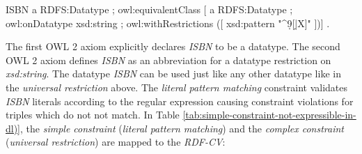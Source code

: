 \documentclass[a4paper,fontsize=11pt]{scrartcl}
\newcommand{\tb}[1]{\todo[size=\small, color=green!40]{\textbf{Thomas:} #1}}
\newcommand{\ms}[1]{\texttt{#1}}
\begin{document}
\begin{ex}
ISBN a RDFS:Datatype ; owl:equivalentClass [ a RDFS:Datatype ;
    owl:onDatatype xsd:string ; 
    owl:withRestrictions ([ xsd:pattern "^\d{9}[\d|X]" ])] .
\end{ex} 
The first OWL 2 axiom explicitly declares {\em ISBN} to be a datatype. %
The second OWL 2 axiom defines {\em ISBN} as an abbreviation for a datatype restriction on {\em xsd:string}. 
The datatype {\em ISBN} can be used just like any other datatype like in the \emph{universal restriction} above.
%
The \emph{literal pattern matching} constraint validates \emph{ISBN} literals according to the regular expression causing constraint violations for triples which do not not match. 
In Table \ref{tab:simple-constraint-not-expressible-in-dl)}, the \emph{simple constraint} (\emph{literal pattern matching}) and the \emph{complex constraint} (\emph{universal restriction}) are mapped to the \emph{RDF-CV}:
\end{document}

